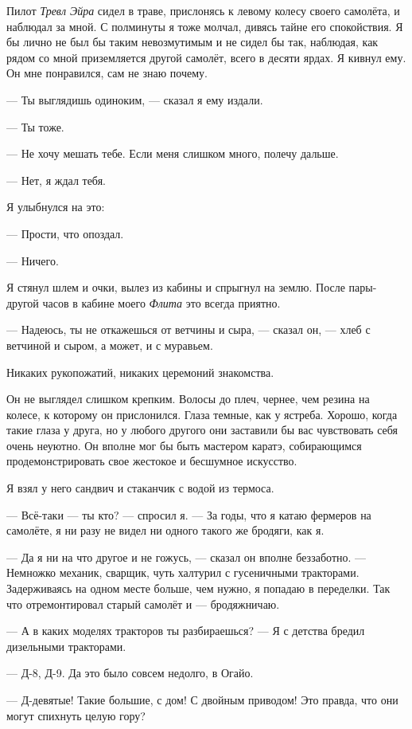 Пилот {\it Тревл Эйра\/} сидел в траве, прислонясь к левому колесу своего самолёта, и наблюдал за мной. С полминуты я тоже молчал, дивясь тайне его спокойствия. Я бы лично не был бы таким невозмутимым и не сидел бы так, наблюдая, как рядом со мной приземляется другой самолёт, всего в десяти ярдах. Я кивнул ему. Он мне понравился, сам не знаю почему.

--- Ты выглядишь одиноким, --- сказал я ему издали.

--- Ты тоже.

--- Не хочу мешать тебе. Если меня слишком много, полечу дальше.

--- Нет, я ждал тебя.

Я улыбнулся на это:

--- Прости, что опоздал.

--- Ничего.

Я стянул шлем и очки, вылез из кабины и спрыгнул на землю. После пары-другой часов в кабине моего
{\it Флита\/} это всегда приятно.

--- Надеюсь, ты не откажешься от ветчины и сыра, --- сказал он, --- хлеб с ветчиной и сыром, а может, и с муравьем.

Никаких рукопожатий, никаких церемоний знакомства.

Он не выглядел слишком крепким. Волосы до плеч, чернее, чем резина на колесе, к которому он прислонился. Глаза темные, как у ястреба. Хорошо, когда такие глаза у друга, но у любого другого они заставили бы вас чувствовать себя очень неуютно. Он вполне мог бы быть мастером каратэ, собирающимся продемонстрировать свое жестокое и бесшумное искусство.

Я взял у него сандвич и стаканчик с водой из термоса.

--- Всё-таки --- ты кто? --- спросил я. --- За годы, что я катаю фермеров на самолёте, я ни разу не видел ни одного такого же бродяги, как я.

--- Да я ни на что другое и не гожусь, --- сказал он вполне беззаботно. --- Немножко механик, сварщик, чуть халтурил с гусеничными тракторами. Задерживаясь на одном месте больше, чем нужно, я попадаю в переделки. Так что отремонтировал старый самолёт и --- бродяжничаю.

--- А в каких моделях тракторов ты разбираешься? --- Я с детства бредил дизельными тракторами.

--- Д-8, Д-9. Да это было совсем недолго, в Огайо.

--- Д-девятые! Такие большие, с дом! С двойным приводом! Это правда, что они могут спихнуть целую гору?

